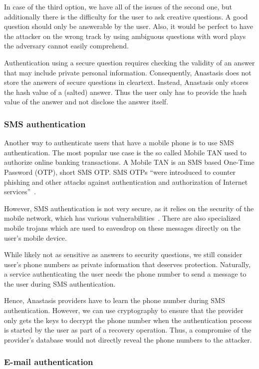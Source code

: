 In case of the third option, we have all of the issues of the second
one, but additionally there is the difficulty for the user to ask
creative questions. A good question should only be answerable by the
user. Also, it would be perfect to have the attacker on the wrong
track by using ambiguous questions with word plays the adversary
cannot easily comprehend.

Authentication using a secure question requires checking the validity
of an answer that may include private personal information.
Consequently, Anastasis does not store the answers of secure questions
in cleartext. Instead, Anastasis only stores the hash value of a
(salted) answer.  Thus the user only has to provide the hash value of
the answer and not disclose the answer itself.

\subsubsection{SMS authentication}

Another way to authenticate users that have a mobile phone is to use
SMS authentication. The most popular use case is the so called Mobile
TAN used to authorize online banking transactions. A Mobile TAN is an
SMS based One-Time Password (OTP), short SMS OTP. SMS OTPs ``were
introduced to counter phishing and other attacks against
authentication and authorization of Internet
services''~\cite{MBSS2013}.

However, SMS authentication is not very secure, as it relies on the
security of the mobile network, which has various
vulnerabilities~\cite{rieck_detection}. There are also specialized
mobile trojans which are used to eavesdrop on these messages directly
on the user's mobile device.

While likely not as sensitive as answers to security questions, we
still consider user's phone numbers as private information that
deserves protection.  Naturally, a service authenticating the user
needs the phone number to send a message to the user during SMS
authentication.

Hence, Anastasis providers have to learn the phone number during SMS
authentication.  However, we can use cryptography to ensure that the
provider only gets the keys to decrypt the phone number when the
authentication process is started by the user as part of a recovery
operation. Thus, a compromise of the provider's database would not
directly reveal the phone numbers to the attacker.


\subsubsection{E-mail authentication}

